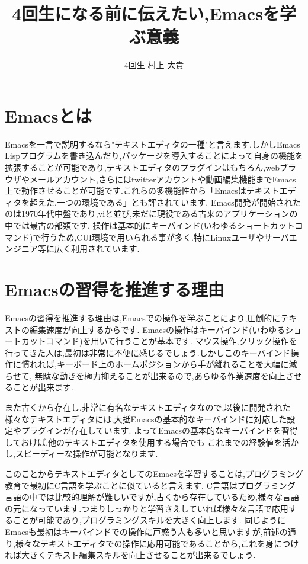 \documentclass[a4j,twocolumn,uplatex]{jarticle}
\begin{document}
\title{4回生になる前に伝えたい,Emacsを学ぶ意義}
\author{4回生 村上 大貴}
\date{}
\maketitle
\section{Emacsとは}
Emacsを一言で説明するなら"テキストエディタの一種"と言えます.しかしEmacs Lispプログラムを書き込んだり,パッケージを導入することによって自身の機能を拡張することが可能であり,テキストエディタのプラグインはもちろん,webブラウザやメールアカウント,さらにはtwitterアカウントや動画編集機能までEmacs上で動作させることが可能です.これらの多機能性から「Emacsはテキストエディタを超えた,一つの環境である」\cite{rubikiti}とも評されています. Emacs開発が開始されたのは1970年代中盤であり,viと並び,未だに現役である古来のアプリケーションの中では最古の部類です\cite{wiki}.
操作は基本的にキーバインド(いわゆるショートカットコマンド)で行うため,CUI環境で用いられる事が多く.特にLinuxユーザやサーバエンジニア等に広く利用されています\cite{liginc}.

\vspace{-4mm}
\section{Emacsの習得を推進する理由}
Emacsの習得を推進する理由は,Emacsでの操作を学ぶことにより,圧倒的にテキストの編集速度が向上するからです.
Emacsの操作はキーバインド(いわゆるショートカットコマンド)を用いて行うことが基本です.
マウス操作,クリック操作を行ってきた人は,最初は非常に不便に感じるでしょう.しかしこのキーバインド操作に慣れれば,キーボード上のホームポジションから手が離れることを大幅に減らせて,
無駄な動きを極力抑えることが出来るので,あらゆる作業速度を向上させることが出来ます.

また古くから存在し,非常に有名なテキストエディタなので,以後に開発された様々なテキストエディタには,大抵Emacsの基本的なキーバインドに対応した設定やプラグインが存在しています.
よってEmacsの基本的なキーバインドを習得しておけば,他のテキストエディタを使用する場合でも
これまでの経験値を活かし,スピーディーな操作が可能となります. 

このことからテキストエディタとしてのEmacsを学習することは,プログラミング教育で最初にC言語を学ぶことに似ていると言えます. C言語はプログラミング言語の中では比較的理解が難しいですが,古くから存在しているため,様々な言語の元になっています.つまりしっかりと学習さえしていれば様々な言語で応用することが可能であり,プログラミングスキルを大きく向上します. 同じようにEmacsも最初はキーバインドでの操作に戸惑う人も多いと思いますが,前述の通り,様々なテキストエディタでの操作に応用可能であることから,これを身につければ大きくテキスト編集スキルを向上させることが出来るでしょう.
\end{document}
